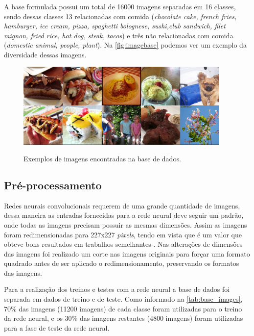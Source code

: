 \par A base formulada possui um total de 16000 imagens separadas em 16 classes, sendo dessas classes 13  relacionadas com comida (\textit{chocolate cake, french fries, hamburger, ice cream, pizza, spaghetti bolognese, sushi,club sandwich, filet mignon, fried rice, hot dog, steak, tacos}) e três não relacionadas com comida (\textit{domestic animal, people, plant}). Na \autoref{fig:imagebase} podemos ver um exemplo da diversidade dessas imagens.
\begin{figure}[H]
  \centering
  \caption{Exemplos de imagens encontradas na base de dados.}
  \includegraphics[width=300pt]{dados/figuras/imagembase}
  \label{fig:imagebase}
\end{figure}

\subsection{Pré-processamento}
\par Redes neurais convolucionais requerem de uma grande quantidade de imagens, dessa maneira as entradas fornecidas para a rede neural deve seguir um padrão, onde todas as imagens precisam possuir as mesmas dimensões. Assim as imagens foram redimensionadas para 227x227 \textit{pixels}, tendo em vista que é um valor que obteve bons resultados em trabalhos semelhantes \cite{imaginetArticle}. Nas alterações de dimensões das imagens foi realizado um corte nas imagens originais para forçar uma formato quadrado antes de ser aplicado o redimensionamento, preservando os formatos das imagens.

\par Para a realização dos treinos e testes com a rede neural a base de dados foi separada em dados de treino e de teste. Como informado na \autoref{tab:base_images}, 70\% das imagens (11200 imagens) de cada classe foram utilizadas para o treino da rede neural, e os 30\% das imagens restantes (4800 imagens) foram utilizadas para a fase de teste da rede neural.

